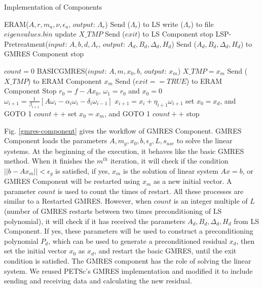 \begin{breakablealgorithm}
	\caption{Implementation of Components}   
	\label{alg:gmres/ls-a}   
	\begin{algorithmic}[1]
		\State ERAM($A, r, m_a, \nu,\epsilon_a$, $output$: $\Lambda_r$)
		\State Send ($\Lambda_r$) to LS
		\State write ($\Lambda_r$) to file $eigenvalues.bin$\EndIf
		\State update $X\_TMP$\EndIf
		\State Send ($exit$) to LS Component  \State stop \EndIf
		\EndWhile
		\EndFunction
		\State LSP-Pretreatment{($input$: $A,b,d,\Lambda_r$, $output$: $A_d, B_d, \Delta_d, H_d$)}
		\State Send ($A_d, B_d, \Delta_d, H_d$) to GMRES Component
		\EndIf
		\State stop \EndIf
		\EndFunction
		
		\State $count=0$
		\State BASICGMRES{($input$: $A, m, x_0,b$, $output$: $x_m$)}
		\State $X\_TMP = x_m$
		\State Send ($X\_TMP$) to ERAM Component
		\State \Return $x_m$
		\State Send ($exit==TRUE$) to ERAM Component
		\State Stop
		\Else {}
		\State $r_0=f-Ax_0$, $\omega_1 = r_0$ and $x_0=0$
		 \label{lsastart}
		\State $\omega_{i+1}=\frac{1}{\beta_{i+1}}[A\omega_i-\alpha_i\omega_i-\delta_i\omega_{i-1}]$
		\State $x_{i+1}=x_i+\eta_{i+1}\omega_{i+1}$
		\EndFor
		\EndFor  \label{lsaend}
		\State set $x_0=x_d$, and GOTO 1
		\State $count++$
		\EndIf
		\Else
		\State set $x_0=x_m$, and GOTO 1
		\State $count++$
		\EndIf
		\EndIf
		\State stop \EndIf
		\EndFunction
	\end{algorithmic}  
\end{breakablealgorithm}

Fig. \ref{gmres-component} gives the workflow of GMRES Component. GMRES Component loads the parameters $A, m_g, x_0, b, \epsilon_g, L, s_{use}$ to solve the linear systems. At the beginning of the execution, it behaves like the basic GMRES method. When it finishes the $m^{th}$ iteration, it will check if the condition $||b-Ax_m||<\epsilon_g$ is satisfied, if yes, $x_m$ is the solution of linear system $Ax=b$, or GMRES Component will be restarted using $x_m$ as a new initial vector. A parameter $count$ is used to count the times of restart. All these processes are similar to a Restarted GMRES. However, when $count$ is an integer multiple of $L$ (number of GMRES restarts between two times preconditioning of LS polynomial), it will check if it has received the parameters $A_d, B_d, \Delta_d, H_d$ from LS Component. If yes, these parameters will be used to construct a preconditioning polynomial $P_d$, which can be used to generate a preconditioned residual $x_d$, then set the initial vector $x_0$ as $x_d$, and restart the basic GMRES, until the exit condition is satisfied. The GMRES component has the role of solving the linear system.  We reused PETSc's GMRES implementation and modified it to include sending and receiving data and calculating the new residual. 

